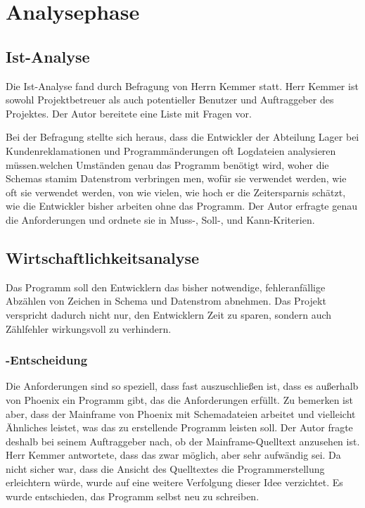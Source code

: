 \section{Analysephase} 
\label{sec:Analysephase}

\subsection{Ist-Analyse} 
\label{sec:IstAnalyse}
Die Ist-Analyse fand durch Befragung von Herrn Kemmer statt. Herr Kemmer ist sowohl Projektbetreuer als auch potentieller Benutzer und Auftraggeber des Projektes. Der Autor bereitete eine Liste mit Fragen vor.

Bei der Befragung stellte sich heraus, dass die Entwickler der Abteilung Lager bei Kundenreklamationen und Programmänderungen oft Logdateien analysieren müssen.welchen Umständen genau das Programm benötigt wird, woher die Schemas stamim Datenstrom verbringen men, wofür sie verwendet werden, wie oft sie verwendet werden, von wie vielen, wie hoch er die Zeitersparnis schätzt, wie die Entwickler bisher arbeiten ohne das Programm. Der Autor erfragte genau die Anforderungen und ordnete sie in Muss-, Soll-, und Kann-Kriterien.


\subsection{Wirtschaftlichkeitsanalyse}
\label{sec:Wirtschaftlichkeitsanalyse}
Das Programm soll den Entwicklern das bisher notwendige, fehleranfällige Abzählen von Zeichen in Schema und Datenstrom abnehmen. Das Projekt verspricht dadurch nicht nur, den Entwicklern Zeit zu sparen, sondern auch Zählfehler wirkungsvoll zu verhindern.

\subsubsection{-Entscheidung}
\label{sec:MakeOrBuyEntscheidung}
Die Anforderungen sind so speziell, dass fast auszuschließen ist, dass es außerhalb von Phoenix ein Programm gibt, das die Anforderungen erfüllt. Zu bemerken ist aber, dass der Mainframe von Phoenix mit Schemadateien arbeitet und vielleicht Ähnliches leistet, was das zu erstellende Programm leisten soll. Der Autor fragte deshalb bei seinem Auftraggeber nach, ob der Mainframe-Quelltext anzusehen ist. Herr Kemmer antwortete, dass das zwar möglich, aber sehr aufwändig sei. Da nicht sicher war, dass die Ansicht des Quelltextes die Programmerstellung erleichtern würde, wurde auf eine weitere Verfolgung dieser Idee verzichtet. Es wurde entschieden, das Programm selbst neu zu schreiben.

